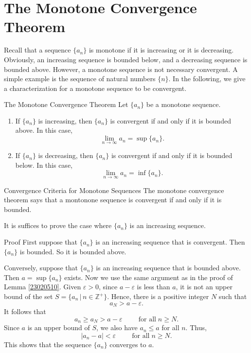\vp
\section{The Monotone Convergence Theorem}\label{sec1.7}



Recall that a  sequence $\{a_n\}$ is monotone if it is increasing or it is decreasing. Obviously,  an increasing sequence is bounded below, and a decreasing sequence is  bounded above. However, a monotone sequence is not necessary convergent. A simple example is the sequence of natural numbers $\{n\}$. In the following, we give a characterization for a monotone sequence to be convergent. 
\begin{theorem}{The Monotone Convergence Theorem}
Let $\{a_n\}$ be a monotone sequence.
\begin{enumerate}[1.]
\item If $\{a_n\}$ is increasing, then $\{a_n\}$ is convergent if and only if it is bounded above. In this case, 
\[\lim_{n\rightarrow\infty}a_n=\sup \{a_n\}.\]
\item If $\{a_n\}$ is decreasing, then $\{a_n\}$ is convergent if and only if it is bounded below. In this case, 
\[\lim_{n\rightarrow\infty}a_n=\inf \{a_n\}.\]
\end{enumerate}
\end{theorem}
\begin{highlight}{Convergence Criteria for Monotone Sequences}
The monotone convergence theorem says that a montonone sequence is convergent if and only if it is bounded.
\end{highlight}
It is suffices to prove the case where $\{a_n\}$ is an increasing sequence. 
\begin{myproof}{Proof}
First suppose that $\{a_n\}$ is an increasing sequence that is convergent.  Then $\{a_n\}$ is bounded. So it is bounded above.

Conversely, suppose that $\{a_n\}$ is an increasing sequence that is bounded above. Then $a=\sup  \{a_n\}$ exists.  Now we use the same argument as in the proof of Lemma \ref{23020510}. Given $\varepsilon>0$, since $a-\varepsilon$ is less than $a$, it is not an upper bound of the set $S=\{a_n\,|\,n\in\mathbb{Z}^+\}$. Hence, there is a positive integer $N$ such that
\[a_N>a-\varepsilon.\]\bp
It follows that
\[a_n\geq a_N>a-\varepsilon\hspace{1cm}\text{for all}\;n\geq N.\]
Since $a$ is an upper bound of $S$, we also have $a_n\leq a$ for all $n$.  Thus,
\[|a_n-a|<\varepsilon\hspace{1cm}\text{for all}\;n\geq N.\]
This shows that the sequence $\{a_n\}$ converges to $a$.
\end{myproof}

